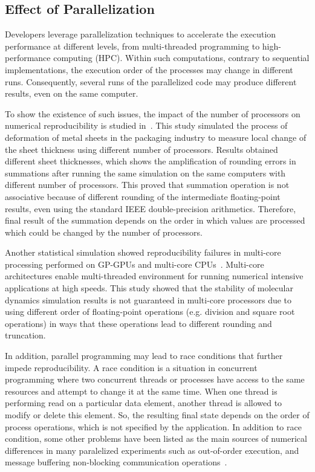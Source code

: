 \subsection{Effect of Parallelization}

Developers leverage parallelization techniques to accelerate the 
execution performance at different levels, from multi-threaded programming to 
high-performance computing (HPC). Within such computations, contrary to 
sequential implementations, the execution order of the processes may 
change in different runs. Consequently, several runs of the 
parallelized code may produce different 
results, even on the same computer. 

To show the existence of such issues, the impact of the number of 
processors on numerical reproducibility is studied 
in~\cite{diethelm2012limits}. This study simulated the process of 
deformation of metal sheets in the packaging industry to measure local 
change of the sheet thickness using different number of processors. 
Results obtained different sheet thicknesses, which shows the 
amplification of rounding errors in summations after running the same 
simulation on the same computers with different number of processors. 
This proved that summation operation is not associative because of 
different rounding of the intermediate floating-point results, even 
using the standard IEEE double-precision arithmetics. Therefore, final 
result of the summation depends on the order in which values are 
processed which could be changed by the number of processors. 

Another statistical simulation showed reproducibility failures in 
multi-core processing performed on GP-GPUs and multi-core 
CPUs~\cite{taufer2010improving}. Multi-core architectures enable 
multi-threaded environment for running numerical intensive applications 
at high speeds. This study showed that the stability of molecular 
dynamics simulation results is not guaranteed in multi-core processors 
due to using different order of floating-point operations (e.g. 
division and square root operations) in ways that these operations lead 
to different rounding and truncation. 

In addition, parallel programming may lead to race conditions that 
further impede reproducibility. A race condition is a situation in 
concurrent programming where two concurrent threads or processes have 
access to the same resources and attempt to change it at the same time. 
When one thread is performing read on a particular data element, 
another thread is allowed to modify or delete this element. So, the 
resulting final state depends on the order of process operations, which 
is not specified by the application. In addition to race condition, 
some other problems have been listed as the main sources of numerical 
differences in many paralelized experiments such as out-of-order 
execution, and message buffering non-blocking communication 
operations~\cite{revol2013numerical}. 

